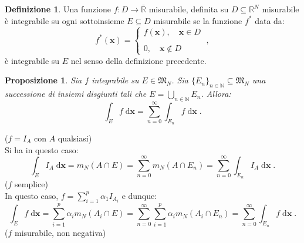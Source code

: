 \documentclass[a4paper,12pt]{report}
\theoremstyle{plain}
\newtheorem{prop}{Proposizione}[section]
\theoremstyle{definition}
\newtheorem{defn}{Definizione}[section]
\theoremstyle{remark}
\newcommand{\diff}[1]{\mathrm{d}#1}
\numberwithin{equation}{section}
\begin{document}
\begin{defn} Una funzione $f:D\to\overline{\mathbb{R}}$ misurabile, definita su $D\subseteq\mathbb{R}^N$ misurabile è integrabile su ogni sottoinsieme $E\subseteq D$ misurabile se la funzione $f^*$ data da:
\begin{equation}
f^*(\mathbf{x})=\begin{cases}
                 f(\mathbf{x}),\quad \mathbf{x}\in D \\
\\
0, \quad \mathbf{x}\not\in D
                \end{cases}\;,
\end{equation}
è integrabile su $E$ nel senso della definizione precedente.
\end{defn}
\begin{prop} Sia $f$ integrabile su $E\in \mathfrak{M}_N$. Sia $\{E_n\}_{n\in\mathbb{N}}\subseteq \mathfrak{M}_N$ una successione di insiemi disgiunti tali che $E=\bigcup_{n\in\mathbb{N}} E_n$. Allora:
\begin{equation}
\int_E f\;\diff{\mathbf{x}}=\sum_{n=0}^{\infty} \int_{E_n} f\;\diff{\mathbf{x}}\;.
\end{equation}
\end{prop}
\proof ($f=I_A$ con $A$ qualsiasi) \\

Si ha in questo caso:
\begin{equation}
\int_E I_A\;\diff{\mathbf{x}}=m_N(A\cap E)=\sum_{n=0}^{\infty} m_N(A\cap E_n)=\sum_{n=0}^{\infty}\int_{E_n} I_A\;\diff{\mathbf{x}}\;.
\end{equation}
\endproof
\proof ($f$ semplice) \\

In questo caso, $f=\sum_{i=1}^p \alpha_1 I_{A_i}$ e dunque:
\begin{equation}
\int_E f\;\diff{\mathbf{x}}=\sum_{i=1}^p \alpha_i m_N(A_i\cap E)=\sum_{n=0}^{\infty}\sum_{i=1}^p \alpha_i m_N(A_i\cap E_n)=\sum_{n=0}^{\infty}\int_{E_n} f\;\diff{\mathbf{x}}\;.
\end{equation}
\endproof
\proof ($f$ misurabile, non negativa) \\
\end{document}
